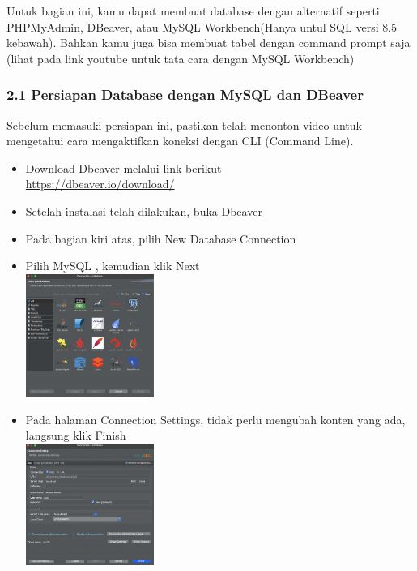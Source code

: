 Untuk bagian ini, kamu dapat membuat database dengan alternatif seperti PHPMyAdmin, DBeaver, atau MySQL Workbench(Hanya untul SQL versi 8.5 kebawah). Bahkan kamu juga bisa membuat tabel dengan command prompt saja (lihat pada link youtube untuk tata cara dengan MySQL Workbench)

\subsubsection{2.1 Persiapan Database dengan MySQL dan DBeaver}

Sebelum memasuki persiapan ini, pastikan telah menonton video untuk mengetahui cara mengaktifkan koneksi dengan CLI (Command Line).

\begin{itemize}
	\item Download Dbeaver melalui link berikut \\ \url{https://dbeaver.io/download/}
	
	\item Setelah instalasi telah dilakukan, buka Dbeaver
	
	\item Pada bagian kiri atas, pilih New Database Connection
	
	\item Pilih MySQL , kemudian klik Next\\
	\includegraphics[width=0.33\textwidth]{assets/pertemuan12/dbeaver-select-connection.png}
	
	\item Pada halaman Connection Settings, tidak perlu mengubah konten yang ada, langsung klik Finish\\
	\includegraphics[width=0.33\textwidth]{assets/pertemuan12/dbeaver-connection-settings.png}
	

\end{itemize}
